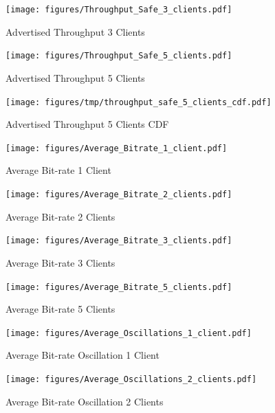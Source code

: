 \documentclass[10pt,sigconf]{acmart}
\begin{document}
\begin{figure}
  \centering
  \texttt{[image: figures/Throughput\_Safe\_3\_clients.pdf]}
  \caption{Advertised Throughput 3 Clients}
  \label{fig:throughput-safe-clients-3}
\end{figure}

\begin{figure}
  \centering
  \texttt{[image: figures/Throughput\_Safe\_5\_clients.pdf]}
  \caption{Advertised Throughput 5 Clients}
  \label{fig:throughput-safe-clients-5}
\end{figure}


\begin{figure}
  \centering
  \texttt{[image: figures/tmp/throughput\_safe\_5\_clients\_cdf.pdf]}
  \caption{Advertised Throughput 5 Clients CDF}
  \label{fig:throughput-precise-cdf}
\end{figure}

\begin{figure}
  \centering
  \texttt{[image: figures/Average\_Bitrate\_1\_client.pdf]}
  \caption{Average Bit-rate 1 Client}
  \label{fig:avg-bitrate-clients-1}
\end{figure}


\begin{figure}
  \centering
  \texttt{[image: figures/Average\_Bitrate\_2\_clients.pdf]}
  \caption{Average Bit-rate 2 Clients}
  \label{fig:avg-bitrate-clients-2}
\end{figure}

\begin{figure}
  \centering
  \texttt{[image: figures/Average\_Bitrate\_3\_clients.pdf]}
  \caption{Average Bit-rate 3 Clients}
  \label{fig:avg-bitrate-clients-3}
\end{figure}

\begin{figure}
  \centering
  \texttt{[image: figures/Average\_Bitrate\_5\_clients.pdf]}
  \caption{Average Bit-rate 5 Clients}
  \label{fig:avg-bitrate-clients-5}
\end{figure}

\begin{figure}
  \centering
  \texttt{[image: figures/Average\_Oscillations\_1\_client.pdf]}
  \caption{Average Bit-rate Oscillation 1 Client}
  \label{fig:avg-oscillation-clients-1}
\end{figure}

\begin{figure}
  \centering
  \texttt{[image: figures/Average\_Oscillations\_2\_clients.pdf]}
  \caption{Average Bit-rate Oscillation 2 Clients}
  \label{fig:avg-oscillation-clients-2}
\end{figure}
\end{document}
